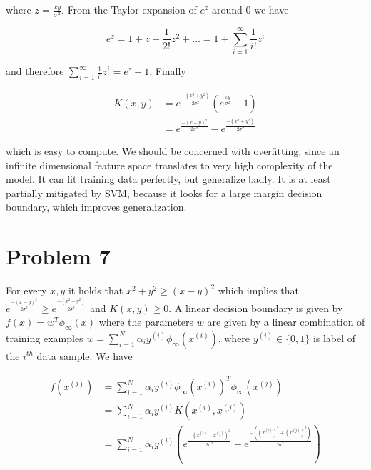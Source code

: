 \documentclass[12pt]{article}
\begin{document}
where $z = \frac{xy}{\sigma^2}$. From the Taylor expansion of $e^z$ around $0$ we have

\begin{equation}
  e^z = 1 + z + \frac{1}{2!} z^2 + \ldots = 1 + \sum_{i=1}^\infty \frac{1}{i!} z^i
\end{equation}

and therefore $\sum_{i=1}^\infty \frac{1}{i!} z^i = e^z - 1$. Finally

\begin{equation}
\begin{align}
 K(x, y) &= e^\frac{-(x^2 + y^2)}{2 \sigma^2} \left( e^\frac{xy}{\sigma^2} - 1 \right) \\
         &= e^\frac{-(x - y)^2}{2 \sigma^2} - e^\frac{-(x^2 + y^2)}{2 \sigma^2}
\end{align}
\end{equation}

which is easy to compute. We should be concerned with overfitting, since an infinite dimensional feature space translates to very high complexity of the model. It can fit training data perfectly, but generalize badly. It is at least partially mitigated by SVM, because it looks for a large margin decision boundary, which improves generalization.      


\section*{Problem 7}

For every $x, y$ it holds that $x^2 + y^2 \geq (x - y)^2$ which implies that $e^\frac{-(x - y)^2}{2 \sigma^2} \geq e^\frac{-(x^2 + y^2)}{2 \sigma^2}$ and $K(x, y) \geq 0$. A linear decision boundary is given by $f(x) = w^T \phi_\infty(x)$ where the parameters $w$ are given by a linear combination of training examples $w = \sum_{i=1}^N \alpha_i y^{(i)} \phi_\infty(x^{(i)})$, where $y^{(i)} \in \{0, 1\}$ is label of the $i^{th}$ data sample. We have 

\begin{equation}
 \begin{align}
  f(x^{(j)}) &= \sum_{i=1}^N \alpha_i y^{(i)} \phi_\infty(x^{(i)})^T \phi_\infty(x^{(j)}) \\
       &= \sum_{i=1}^N  \alpha_i y^{(i)} K(x^{(i)}, x^{(j)}) \\
       &= \sum_{i=1}^N  \alpha_i y^{(i)} \left( e^\frac{-\left(x^{(i)} - x^{(j)}\right)^2}{2 \sigma^2} - e^\frac{-\left(\left(x^{(i)}\right)^2 + \left(x^{(j)}\right)^2\right)}{2 \sigma^2} \right)
 \end{align}
\end{equation}
\end{document}
